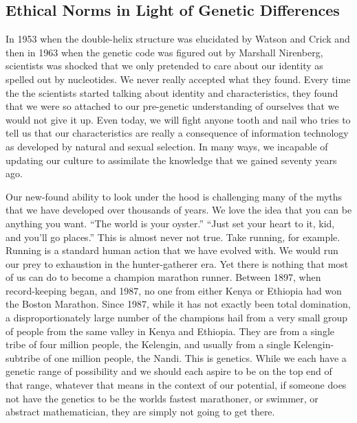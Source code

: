 \subsection{Ethical Norms in Light of Genetic Differences}

In 1953 when the double-helix structure was elucidated by Watson and Crick and then in 1963 when the genetic code was figured out by Marshall Nirenberg, scientists was shocked that we only pretended to care about our identity as spelled out by nucleotides.
We never really accepted what they found.
Every time the the scientists started talking about identity and characteristics, they found that we were so attached to our pre-genetic understanding of ourselves that we would not give it up.
Even today, we will fight anyone tooth and nail who tries to tell us that our characteristics are really a consequence of information technology as developed by natural and sexual selection.
In many ways, we incapable of updating our culture to assimilate the knowledge that we gained seventy years ago.

Our new-found ability to look under the hood is challenging many of the myths that we have developed over thousands of years.
We love the idea that you can be anything you want.
``The world is your oyster.''
``Just set your heart to it, kid, and you'll go places.''
This is almost never not true.
Take running, for example.
Running is a standard human action that we have evolved with.
We would run our prey to exhaustion in the hunter-gatherer era.
Yet there is nothing that most of us can do to become a champion marathon runner.
Between 1897, when record-keeping began, and 1987, no one from either Kenya or Ethiopia had won the Boston Marathon.
Since 1987, while it has not exactly been total domination, a disproportionately large number of the champions hail from a very small group of people from the same valley in Kenya and Ethiopia.
They are from a single tribe of four million people, the Kelengin, and usually from a single Kelengin-subtribe of one million people, the Nandi.
This is genetics.
While we each have a genetic range of possibility and we should each aspire to be on the top end of that range, whatever that means in the context of our potential, if someone does not have the genetics to be the worlds fastest marathoner, or swimmer, or abstract mathematician, they are simply not going to get there.

